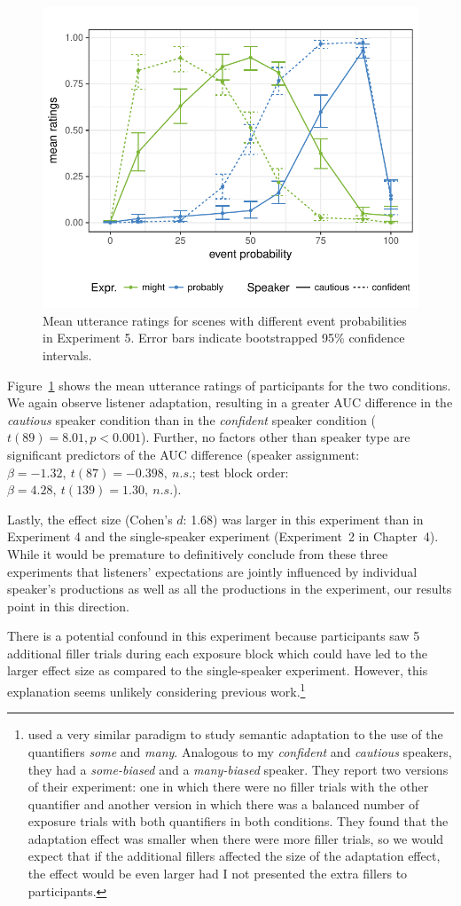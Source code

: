 \begin{figure}
\center
\includegraphics[width=0.5\columnwidth]{plots/exp2-results.pdf}
\caption{Mean utterance ratings for scenes with different event probabilities in Experiment 5. Error bars indicate bootstrapped 95\% confidence intervals. \label{fig:exp2-results}}
\end{figure}

Figure~\ref{fig:exp2-results} shows the mean utterance ratings of participants for the two conditions. We again observe listener adaptation, resulting in a greater AUC difference in the \emph{cautious} speaker 
condition than in the \emph{confident} speaker condition ($t(89)=8.01, p < 0.001$). Further, no factors
other than speaker type are significant predictors of the AUC difference 
(speaker assignment: $\beta=-1.32, \ t(87)=-0.398, \ n.s.$; test block order:  $\beta=4.28, \ t(139)=1.30, \ n.s.$).

Lastly, the effect size (Cohen's $d$: 1.68) was larger in this experiment than in Experiment 4 and the single-speaker 
experiment (Experiment~2 in Chapter~4). While it would be premature to definitively conclude from these three experiments that listeners' expectations are jointly influenced
by individual speaker's productions as well as all the productions in the experiment, our results point in this direction. 

There is a potential confound in this experiment because participants saw 5 additional filler trials during each exposure block which could have led to the larger effect size as compared
to the single-speaker experiment. However, this explanation seems unlikely considering previous work.\footnote{\textcite{Yildirim2016} used 
a very similar paradigm to study semantic adaptation to the use of the quantifiers \textit{some} and \textit{many}. Analogous to my \textit{confident} and 
\textit{cautious} speakers, they had a \textit{some-biased} and a \textit{many-biased} speaker. They report two versions of their experiment: one in which
there were no filler trials with the other quantifier and another version in which there was a balanced number of exposure trials with both quantifiers in both conditions. They found that the adaptation effect was smaller when there were more filler trials, so we would expect that if the additional fillers affected the size of the adaptation effect, the effect would be even larger had I not presented the extra fillers to participants.}


